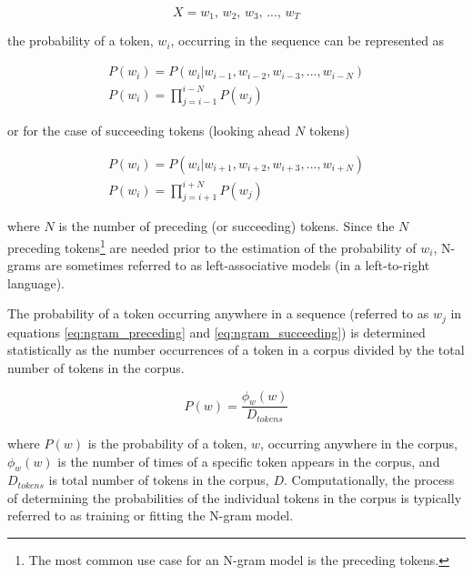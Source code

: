 \documentclass[12pt]{article}
\begin{document}
\begin{equation}\label{eq:ngram_sequence}
    X = \mbox{$w_1$, $w_2$, $w_3$, ..., $w_T$}
\end{equation}

\noindent
the probability of a token, $w_i$, occurring in the sequence can be represented as

\begin{equation}\label{eq:ngram_preceding}
    \begin{gathered}
        P(w_i) = P(w_i|w_{i-1},w_{i-2},w_{i-3},...,w_{i-N}) \\
        P(w_i) = \prod_{j=i-1}^{i-N} P(w_j)
    \end{gathered}
\end{equation}

\noindent
or for the case of succeeding tokens (looking ahead $N$ tokens)

\begin{equation}\label{eq:ngram_succeeding}
    \begin{gathered}
        P(w_i) = P(w_i|w_{i+1},w_{i+2},w_{i+3},...,w_{i+N}) \\
        P(w_i) = \prod_{j=i+1}^{i+N} P(w_j)
    \end{gathered}
\end{equation}

\noindent
where $N$ is the number of preceding (or succeeding) tokens. Since the $N$ preceding tokens\footnote{The most common use case for an N-gram model is
    the preceding tokens.} are needed prior to the estimation of the probability of $w_i$, N-grams are sometimes referred to as left-associative
models (in a left-to-right language).

The probability of a token occurring anywhere in a sequence (referred to as $w_j$ in equations \ref{eq:ngram_preceding} and \ref{eq:ngram_succeeding})
is determined statistically as the number occurrences of a token in a corpus divided by the total number of tokens in the corpus.

\begin{equation}\label{eq:ngram_prob_wj}
    P(w) = \frac{\phi_w(w)}{D_{tokens}}
\end{equation}

\noindent
where $P(w)$ is the probability of a token, $w$, occurring anywhere in the corpus, $\phi_w(w)$ is the number of times of a specific
token appears in the corpus, and $D_{tokens}$ is total number of tokens in the corpus, $D$. Computationally, the process of determining the
probabilities of the individual tokens in the corpus is typically referred to as training or fitting the N-gram model.
\end{document}
